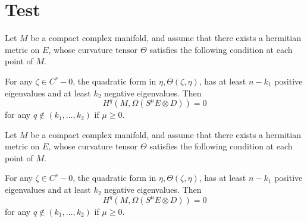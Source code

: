 \documentclass[12pt]{book}
\begin{document}
\chapter{Test}
\begin{theorem}
   Let $M$ be a compact complex manifold, and assume that there exists a hermitian metric on $E$, whose curvature tensor $\Theta$ satisfies the following condition at each point of $M$.
        
   For any $\zeta\in C^r-0$, the quadratic form in $\eta,\Theta(\zeta,\eta)$, has at least $n-k_1$ positive eigenvalues and at least $k_2$ negative eigenvalues. Then 
    \[H^q(M,\Omega(S^\mu E\otimes D))=0\]
    for any $q\not\in (k_1,\ldots,k_2)$ if $\mu\geq 0$.
\end{theorem}

\begin{theorem}
   Let $M$ be a compact complex manifold, and assume that there exists a hermitian metric on $E$, whose curvature tensor $\Theta$ satisfies the following condition at each point of $M$.
        
   For any $\zeta\in C^r-0$, the quadratic form in $\eta,\Theta(\zeta,\eta)$, has at least $n-k_1$ positive eigenvalues and at least $k_2$ negative eigenvalues. Then 
    \[H^q(M,\Omega(S^\mu E\otimes D))=0\]
    for any $q\not\in (k_1,\ldots,k_2)$ if $\mu\geq 0$.
\end{theorem}
\end{document}

